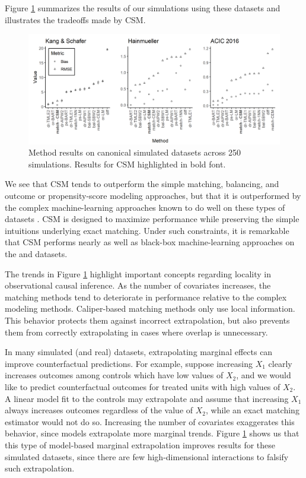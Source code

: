 \documentclass{article}
\begin{document}
Figure \ref{fig:sim_results} summarizes the results of our simulations using these datasets and illustrates the tradeoffs made by CSM.
\begin{figure}[t]
    \centering
    \includegraphics[width=\textwidth]{writeup/figures/sim_results.png}
    \caption{Method results on canonical simulated datasets across 250 simulations. 
        Results for CSM highlighted in bold font.}
    \label{fig:sim_results}
\end{figure}
We see that CSM tends to outperform the simple matching, balancing, and outcome or propensity-score modeling approaches, but that it is outperformed by the complex machine-learning approaches known to do well on these types of datasets \citep{dorie2019automated}.
CSM is designed to maximize performance while preserving the simple intuitions underlying exact matching.
Under such constraints, it is remarkable that CSM performs nearly as well as black-box machine-learning approaches on the \citet{kang2007demystifying} and \citet{hainmueller2012entropy} datasets.

The trends in Figure \ref{fig:sim_results} highlight important concepts regarding locality in observational causal inference.
As the number of covariates increases, the matching methods tend to deteriorate in performance relative to the complex modeling methods.
Caliper-based matching methods only use local information.
This behavior protects them against incorrect extrapolation, but also prevents them from correctly extrapolating in cases where overlap is unnecessary.

In many simulated (and real) datasets, extrapolating marginal effects can improve counterfactual predictions.
For example, suppose increasing $X_1$ clearly increases outcomes among controls which have low values of $X_2$, and we would like to predict counterfactual outcomes for treated units with high values of $X_2$.
A linear model fit to the controls may extrapolate and assume that increasing $X_1$ always increases outcomes regardless of the value of $X_2$, while an exact matching estimator would not do so.
Increasing the number of covariates exaggerates this behavior, since models extrapolate more marginal trends.
Figure \ref{fig:sim_results} shows us that this type of model-based marginal extrapolation improves results for these simulated datasets, since there are few high-dimensional interactions to falsify such extrapolation.
\end{document}
